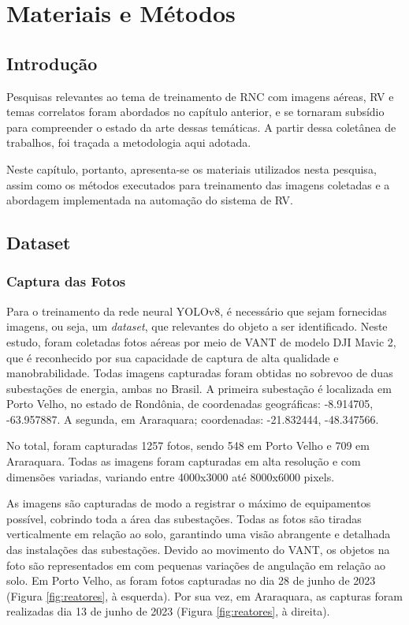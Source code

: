 \chapter{Materiais e Métodos}

\section{Introdução}

Pesquisas relevantes ao tema de treinamento de RNC com imagens aéreas, RV e temas correlatos foram abordados no capítulo anterior, e se tornaram subsídio para compreender o estado da arte dessas temáticas. A partir dessa coletânea de trabalhos, foi traçada a metodologia aqui adotada.

Neste capítulo, portanto, apresenta-se os materiais utilizados nesta pesquisa, assim como os métodos executados para treinamento das imagens coletadas e a abordagem implementada na automação do sistema de RV.

\section{Dataset}

\subsection{Captura das Fotos}

Para o treinamento da rede neural YOLOv8, é necessário que sejam fornecidas imagens, ou seja, um \textit{dataset}, que relevantes do objeto a ser identificado. Neste estudo, foram coletadas fotos aéreas por meio de VANT de modelo DJI Mavic 2, que é reconhecido por sua capacidade de captura de alta qualidade e manobrabilidade. Todas imagens capturadas foram obtidas no sobrevoo de duas subestações de energia, ambas no Brasil. A primeira subestação é localizada em Porto Velho, no estado de Rondônia, de coordenadas geográficas: -8.914705, -63.957887. A segunda, em Araraquara; coordenadas: -21.832444, -48.347566. 

No total, foram capturadas 1257 fotos, sendo  548 em Porto Velho e 709 em Araraquara. Todas as imagens foram capturadas em alta resolução e com dimensões variadas, variando entre 4000x3000 até 8000x6000 pixels. 

As imagens são capturadas de modo a registrar o máximo de equipamentos possível, cobrindo toda a área das subestações. Todas as fotos são tiradas verticalmente em relação ao solo, garantindo uma visão abrangente e detalhada das instalações das subestações. Devido ao movimento do VANT, os objetos na foto são representados em com pequenas variações de angulação em relação ao solo. Em Porto Velho, as foram fotos capturadas no dia 28 de junho de 2023 (Figura \ref{fig:reatores}, à esquerda). Por sua vez, em Araraquara, as capturas foram realizadas dia 13 de junho de 2023 (Figura  \ref{fig:reatores}, à direita).

